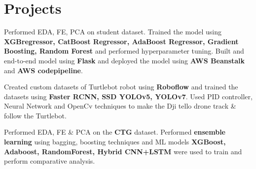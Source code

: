 \documentclass[letterpaper]{deedy-resume} %
\begin{document}
\begin{minipage}[t]{0.66\textwidth}

\vspace{-2.5mm}

\section{Projects}


Performed EDA, FE, PCA on student dataset. Trained the model using \textbf{XGBregressor, CatBoost Regressor, AdaBoost Regressor, Gradient Boosting, Random Forest} and performed hyperparameter tuning. Built and end-to-end model using \textbf{Flask} and deployed the model using \textbf{AWS Beanstalk} and \textbf{AWS codepipeline}.

\sectionspace %



Created custom datasets of Turtlebot robot using \textbf{Roboflow} and trained the datasets using \textbf{Faster RCNN, SSD YOLOv5, YOLOv7}. Used PID controller, Neural Network and OpenCv techniques to make the Dji tello drone track \& follow the Turtlebot.

\sectionspace %



Performed EDA, FE \& PCA on the \textbf{CTG} dataset. Performed \textbf{ensemble learning} using bagging, boosting techniques and ML models \textbf{XGBoost, Adaboost, RandomForest, Hybrid CNN+LSTM} were used to train and perform comparative analysis. 

\sectionspace %



\end{minipage}
\end{document}
